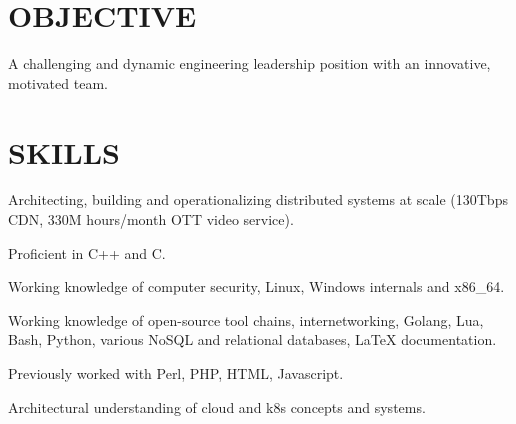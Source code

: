 \documentclass[margin]{res}
\begin{document}

\address{david.andrews112@gmail.com \ \ \ (949) 633-0588}



\begin{resume}

\section{OBJECTIVE}
A challenging and dynamic engineering leadership position with an innovative, motivated team.


\section{SKILLS}
\begin{list}{}{\leftmargin=0em \topsep=0pt \partopsep=0pt \parsep=2.5pt}
  \item Architecting, building and operationalizing distributed systems at scale (130Tbps CDN, 330M hours/month OTT video service).
  \item Proficient in C++ and C.
  \item Working knowledge of computer security, Linux, Windows internals and x86\_64.
  \item Working knowledge of open-source tool chains, internetworking,
    Golang, Lua, Bash, Python, various NoSQL and relational databases, \LaTeX{} documentation.
  \item Previously worked with Perl, PHP, HTML, Javascript.
  \item Architectural understanding of cloud and k8s concepts and systems.
\end{list}




\end{resume}
\end{document}
